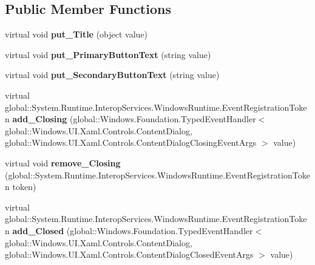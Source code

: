 \subsection*{Public Member Functions}
\begin{DoxyCompactItemize}
\item 
\mbox{\label{class_windows_1_1_u_i_1_1_xaml_1_1_controls_1_1_content_dialog_a0a34b740496886293e402395da09194f}} 
virtual void {\bfseries put\+\_\+\+Title} (object value)
\item 
\mbox{\label{class_windows_1_1_u_i_1_1_xaml_1_1_controls_1_1_content_dialog_adcf99702d4b190842bce4c72ae4f8e60}} 
virtual void {\bfseries put\+\_\+\+Primary\+Button\+Text} (string value)
\item 
\mbox{\label{class_windows_1_1_u_i_1_1_xaml_1_1_controls_1_1_content_dialog_a0c1be8e4e5f2ada768536bad2d8ca78b}} 
virtual void {\bfseries put\+\_\+\+Secondary\+Button\+Text} (string value)
\item 
\mbox{\label{class_windows_1_1_u_i_1_1_xaml_1_1_controls_1_1_content_dialog_a112044e25750429e881c4e8edede4a3b}} 
virtual global\+::\+System.\+Runtime.\+Interop\+Services.\+Windows\+Runtime.\+Event\+Registration\+Token {\bfseries add\+\_\+\+Closing} (global\+::\+Windows.\+Foundation.\+Typed\+Event\+Handler$<$ global\+::\+Windows.\+U\+I.\+Xaml.\+Controls.\+Content\+Dialog, global\+::\+Windows.\+U\+I.\+Xaml.\+Controls.\+Content\+Dialog\+Closing\+Event\+Args $>$ value)
\item 
\mbox{\label{class_windows_1_1_u_i_1_1_xaml_1_1_controls_1_1_content_dialog_a13479534a17ee5bc6c49534a00724ca9}} 
virtual void {\bfseries remove\+\_\+\+Closing} (global\+::\+System.\+Runtime.\+Interop\+Services.\+Windows\+Runtime.\+Event\+Registration\+Token token)
\item 
\mbox{\label{class_windows_1_1_u_i_1_1_xaml_1_1_controls_1_1_content_dialog_a6211ece9675f87d6eff022d36ec839af}} 
virtual global\+::\+System.\+Runtime.\+Interop\+Services.\+Windows\+Runtime.\+Event\+Registration\+Token {\bfseries add\+\_\+\+Closed} (global\+::\+Windows.\+Foundation.\+Typed\+Event\+Handler$<$ global\+::\+Windows.\+U\+I.\+Xaml.\+Controls.\+Content\+Dialog, global\+::\+Windows.\+U\+I.\+Xaml.\+Controls.\+Content\+Dialog\+Closed\+Event\+Args $>$ value)

\end{DoxyCompactItemize}
